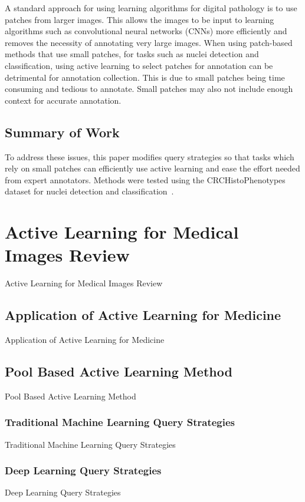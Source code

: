 A standard approach for using learning algorithms for digital pathology is to use patches from larger images. This allows the images to be input to learning algorithms such as convolutional neural networks (CNNs) more efficiently and removes the necessity of annotating very large images. When using patch-based methods that use small patches, for tasks such as nuclei detection and classification, using active learning to select patches for annotation can be detrimental for annotation collection. This is due to small patches being time consuming and tedious to annotate. Small patches may also not include enough context for accurate annotation.

\subsection{Summary of Work}
To address these issues, this paper modifies query strategies so that tasks which rely on small patches can efficiently use active learning and ease the effort needed from expert annotators. Methods were tested using the CRCHistoPhenotypes dataset for nuclei detection and classification~\cite{sirinukunwattana2016locality}. 



\section{Active Learning for Medical Images Review}
Active Learning for Medical Images Review

\subsection{Application of Active Learning for Medicine}
Application of Active Learning for Medicine

\subsection{Pool Based Active Learning Method}
Pool Based Active Learning Method 

\subsubsection{Traditional Machine Learning Query Strategies}
Traditional Machine Learning Query Strategies

\subsubsection{Deep Learning Query Strategies}
Deep Learning Query Strategies

